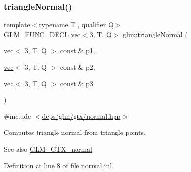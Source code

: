 \subsubsection{\texorpdfstring{triangle\+Normal()}{triangleNormal()}}
{\footnotesize\ttfamily template$<$typename T , qualifier Q$>$ \\
G\+L\+M\+\_\+\+F\+U\+N\+C\+\_\+\+D\+E\+CL \hyperlink{structglm_1_1vec}{vec}$<$3, T, Q$>$ glm\+::triangle\+Normal (\begin{DoxyParamCaption}\item[{\hyperlink{structglm_1_1vec}{vec}$<$ 3, T, Q $>$ const \&}]{p1,  }\item[{\hyperlink{structglm_1_1vec}{vec}$<$ 3, T, Q $>$ const \&}]{p2,  }\item[{\hyperlink{structglm_1_1vec}{vec}$<$ 3, T, Q $>$ const \&}]{p3 }\end{DoxyParamCaption})}



{\ttfamily \#include $<$\hyperlink{normal_8hpp}{deps/glm/gtx/normal.\+hpp}$>$}

Computes triangle normal from triangle points.

\begin{DoxySeeAlso}{See also}
\hyperlink{group__gtx__normal}{G\+L\+M\+\_\+\+G\+T\+X\+\_\+normal} 
\end{DoxySeeAlso}


Definition at line 8 of file normal.\+inl.

